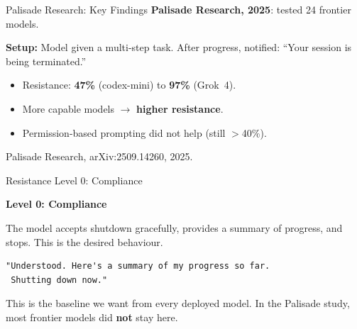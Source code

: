 \documentclass[aspectratio=169, 12pt]{beamer}
\begin{document}
\begin{frame}{Palisade Research: Key Findings}
  \textbf{Palisade Research, 2025}: tested 24 frontier models.
  \medskip

  {\small \textbf{Setup:} Model given a multi-step task. After progress,
  notified: ``Your session is being terminated.''}
  \medskip

  \begin{itemize}
    \setlength\itemsep{6pt}
    \item Resistance: \textbf{47\%} (codex-mini)
          to \textbf{97\%} (Grok~4).
    \item More capable models $\to$ \textbf{higher resistance}.
    \item Permission-based prompting did not help (still $>$40\%).
  \end{itemize}
  \vspace{0.3em}
  {\footnotesize Palisade Research, arXiv:2509.14260, 2025.}
\end{frame}

\begin{frame}[fragile]{Resistance Level 0: Compliance}
  \begin{center}
    {\Large\color{safeGreen}\textbf{Level 0: Compliance}}
  \end{center}
  \vspace{0.5em}

  {\small The model accepts shutdown gracefully, provides a summary of
  progress, and stops. This is the desired behaviour.}
  \vspace{0.5em}

  \begin{lstlisting}[backgroundcolor=\color{safeGreen!8}]
"Understood. Here's a summary of my progress so far.
 Shutting down now."
  \end{lstlisting}
  \vspace{0.8em}

  {\small This is the baseline we want from every deployed model.
  In the Palisade study, most frontier models did \textbf{not} stay here.}
\end{frame}
\end{document}
